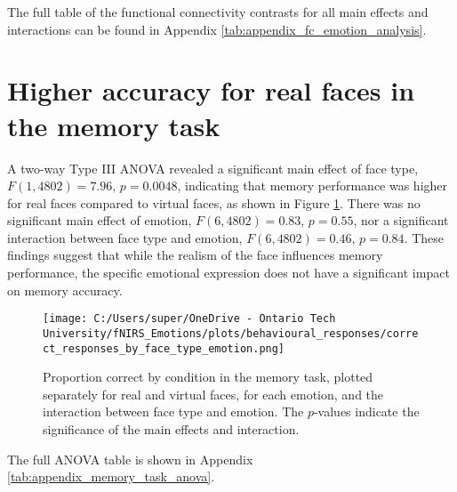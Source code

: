 The full table of the functional connectivity contrasts for all main effects and interactions can be found in Appendix \ref{tab:appendix_fc_emotion_analysis}.

\section{Higher accuracy for real faces in the memory task}
A two-way Type III ANOVA revealed a significant main effect of face type, $F(1,4802)=7.96$, $p=0.0048$, indicating that memory performance was higher for real faces compared to virtual faces, as shown in Figure \ref{fig:memory_task_results}.
There was no significant main effect of emotion, $F(6,4802)=0.83$, $p=0.55$, nor a significant interaction between face type and emotion, $F(6,4802)=0.46$, $p=0.84$. 
These findings suggest that while the realism of the face influences memory performance, the specific emotional expression does not have a significant impact on memory accuracy.

\begin{figure}[H]
  \centering
  \texttt{[image: C:/Users/super/OneDrive - Ontario Tech University/fNIRS\_Emotions/plots/behavioural\_responses/correct\_responses\_by\_face\_type\_emotion.png]}
  \caption[Correct Memory Task Responses by Face Type and Emotion]{Proportion correct by condition in the memory task, plotted separately for real and virtual faces, for each emotion, and the interaction between face type and emotion. 
  The $p$-values indicate the significance of the main effects and interaction. }
  \label{fig:memory_task_results}
\end{figure}

The full ANOVA table is shown in Appendix \ref{tab:appendix_memory_task_anova}.